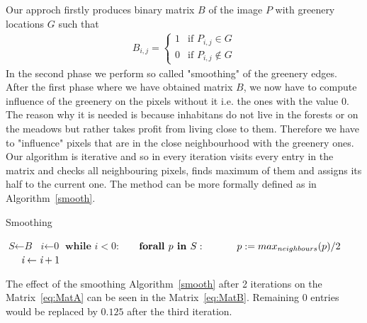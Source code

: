 \documentclass[letterpaper]{article}
\begin{document}
\indent Our approch firstly produces binary matrix $B$ of the image $P$ with greenery locations $G$ such that 
\newline
\begin{align*}
B_{i,j} = \begin{cases} 1 & \text{if } P_{i,j} \in G\\
                         0 & \text{if } P_{i,j} \notin G  
\end{cases}
\end{align*}
\newline
In the second phase we perform so called "smoothing" of the greenery edges. After the first phase where we have obtained matrix $B$,
we now have to compute influence of the greenery on the pixels without it i.e. the ones with the value 0. The reason why it is needed is 
because inhabitans do not live in the forests or on the meadows but rather takes profit from living close to them. Therefore we have 
to "influence" pixels that are in the close neighbourhood with the greenery ones. Our algorithm is iterative and so in every iteration 
visits every entry in the matrix and checks all neighbouring pixels, finds maximum of them and assigns its half to the current one. 
The method can be more formally defined as in Algorithm~\ref{smooth}.

\begin{algorithm}
    \caption{Smoothing}\label{smooth}
    \begin{algorithmic}[1]
    \State $\textit{S} \gets \textit{B}$
    \State $\textit{i} \gets \textit{0}$
    \State $\textbf{while } \textit{i} < 0:$
    \State $\indent \textbf{forall } p \textbf{ in } S:$
    \State $\indent \indent p := max_{neighbours}(p) / 2$
    \State $\indent \textit{i} \gets \textit{i} + 1$
    \EndProcedure
    \end{algorithmic}
    \end{algorithm}
    
The effect of the smoothing Algorithm~\ref{smooth} after 2 iterations on the Matrix~\ref{eq:MatA} 
can be seen in the Matrix~\ref{eq:MatB}. Remaining $0$ entries would be replaced by $0.125$ after 
the third iteration.
\end{document}
